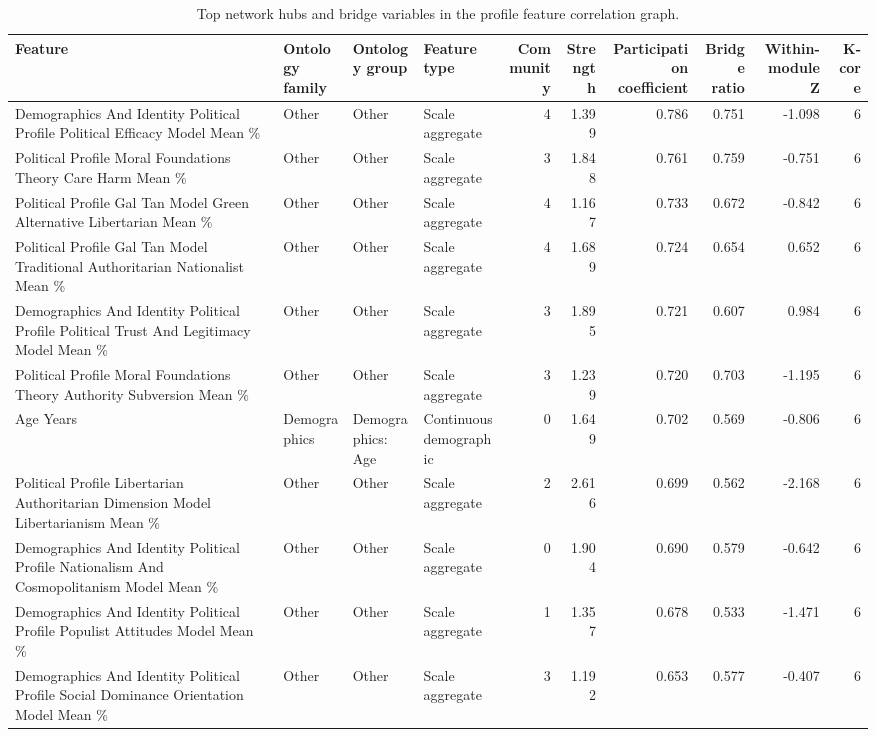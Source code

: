 \begin{table}[htbp]
\centering
\begin{threeparttable}
\caption{Top network hubs and bridge variables in the profile feature correlation graph.}
\label{tab:networksummary}
\small
\setlength{\tabcolsep}{4.5pt}
\renewcommand{\arraystretch}{1.10}
\begin{adjustbox}{max width=\linewidth}
\begin{tabular}{llllrrrrrr}
\toprule
Feature & Ontology family & Ontology group & Feature type & Community & Strength & Participation coefficient & Bridge ratio & Within-module Z & K-core \\
\midrule
Demographics And Identity Political Profile Political Efficacy Model Mean \% & Other & Other & Scale aggregate & 4 & 1.399 & 0.786 & 0.751 & -1.098 & 6 \\
Political Profile Moral Foundations Theory Care Harm Mean \% & Other & Other & Scale aggregate & 3 & 1.848 & 0.761 & 0.759 & -0.751 & 6 \\
Political Profile Gal Tan Model Green Alternative Libertarian Mean \% & Other & Other & Scale aggregate & 4 & 1.167 & 0.733 & 0.672 & -0.842 & 6 \\
Political Profile Gal Tan Model Traditional Authoritarian Nationalist Mean \% & Other & Other & Scale aggregate & 4 & 1.689 & 0.724 & 0.654 & 0.652 & 6 \\
Demographics And Identity Political Profile Political Trust And Legitimacy Model Mean \% & Other & Other & Scale aggregate & 3 & 1.895 & 0.721 & 0.607 & 0.984 & 6 \\
Political Profile Moral Foundations Theory Authority Subversion Mean \% & Other & Other & Scale aggregate & 3 & 1.239 & 0.720 & 0.703 & -1.195 & 6 \\
Age Years & Demographics & Demographics: Age & Continuous demographic & 0 & 1.649 & 0.702 & 0.569 & -0.806 & 6 \\
Political Profile Libertarian Authoritarian Dimension Model Libertarianism Mean \% & Other & Other & Scale aggregate & 2 & 2.616 & 0.699 & 0.562 & -2.168 & 6 \\
Demographics And Identity Political Profile Nationalism And Cosmopolitanism Model Mean \% & Other & Other & Scale aggregate & 0 & 1.904 & 0.690 & 0.579 & -0.642 & 6 \\
Demographics And Identity Political Profile Populist Attitudes Model Mean \% & Other & Other & Scale aggregate & 1 & 1.357 & 0.678 & 0.533 & -1.471 & 6 \\
Demographics And Identity Political Profile Social Dominance Orientation Model Mean \% & Other & Other & Scale aggregate & 3 & 1.192 & 0.653 & 0.577 & -0.407 & 6 \\

\end{tabular}
\end{adjustbox}
\end{threeparttable}
\end{table}
